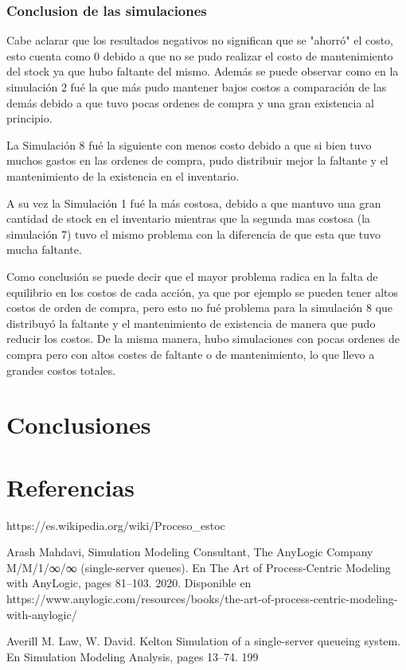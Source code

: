     \subsubsection{Conclusion de las simulaciones}\label{subsubsec:conclusiones}
    Cabe aclarar que los resultados negativos no significan que se "ahorró" el costo, esto cuenta como 0 debido a que no se pudo realizar el costo de mantenimiento del stock ya que hubo faltante del mismo.
    Además se puede observar como en la simulación 2 fué la que más pudo mantener bajos costos a comparación de las demás debido a que tuvo pocas ordenes de compra y una gran existencia al principio.

    La Simulación 8 fué la siguiente con menos costo debido a que si bien tuvo muchos gastos en las ordenes de compra, pudo distribuir mejor la faltante y el mantenimiento de la existencia en el inventario.

    A su vez la Simulación 1 fué la más costosa, debido a que mantuvo una gran cantidad de stock en el inventario mientras que la segunda mas costosa (la simulación 7) tuvo el mismo problema con la diferencia de que esta que tuvo mucha faltante.

    Como conclusión se puede decir que el mayor problema radica en la falta de equilibrio en los costos de cada acción, ya que por ejemplo se pueden tener altos costos de orden de compra, pero esto no fué problema para la simulación 8 que distribuyó la faltante y el mantenimiento de existencia de manera que pudo reducir los costos.
    De la misma manera, hubo simulaciones con pocas ordenes de compra pero con altos costes de faltante o de mantenimiento, lo que llevo a grandes costos totales.


\section{Conclusiones}
\section{Referencias}
  \label{sec:references}
    https://es.wikipedia.org/wiki/Proceso\_estoc%

    Arash Mahdavi, Simulation Modeling Consultant, The AnyLogic Company M/M/1/∞/∞ (single-server
    queues). En The Art of Process-Centric Modeling with AnyLogic, pages 81–103. 2020. Disponible en https://www.anylogic.com/resources/books/the-art-of-process-centric-modeling-with-anylogic/

    Averill M. Law, W. David. Kelton Simulation of a single-server queueing system. En Simulation Modeling Analysis,
    pages 13–74. 199
